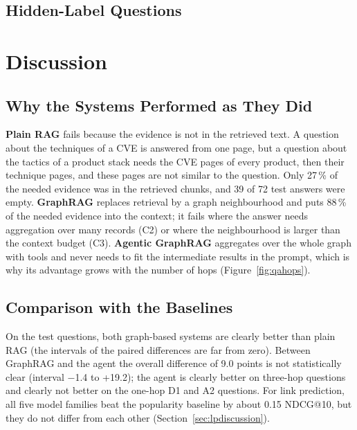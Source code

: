 \documentclass[12pt, a4paper]{article}
\newif\ifshowtodo  \showtodofalse    %
\newcommand{\TODO}[1]{\ifshowtodo{\par\small\itshape\color{gray}[#1]\par}\fi}
\begin{document}
\subsection{Hidden-Label Questions}
\TODO{[final-year version only] Questions whose gold answers depend on links that were hidden from the graph; the agent calls the link-prediction model as a tool.}
\fi

\section{Discussion}
\subsection{Why the Systems Performed as They Did}
\textbf{Plain RAG} fails because the evidence is not in the retrieved text. A question about the techniques of a CVE is answered from one page, but a question about the tactics of a product stack needs the CVE pages of every product, then their technique pages, and these pages are not similar to the question. Only 27\,\% of the needed evidence was in the retrieved chunks, and 39 of 72 test answers were empty. \textbf{GraphRAG} replaces retrieval by a graph neighbourhood and puts 88\,\% of the needed evidence into the context; it fails where the answer needs aggregation over many records (C2) or where the neighbourhood is larger than the context budget (C3). \textbf{Agentic GraphRAG} aggregates over the whole graph with tools and never needs to fit the intermediate results in the prompt, which is why its advantage grows with the number of hops (Figure~\ref{fig:qahops}).
\subsection{Comparison with the Baselines}
On the test questions, both graph-based systems are clearly better than plain RAG (the intervals of the paired differences are far from zero). Between GraphRAG and the agent the overall difference of 9.0 points is not statistically clear (interval $-$1.4 to +19.2); the agent is clearly better on three-hop questions and clearly not better on the one-hop D1 and A2 questions. For link prediction, all five model families beat the popularity baseline by about 0.15 NDCG@10, but they do not differ from each other (Section~\ref{sec:lpdiscussion}).
\end{document}

